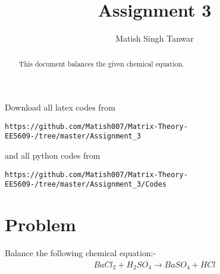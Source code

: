 \documentclass[journal,12pt,twocolumn]{IEEEtran}
\begin{document}
      \def\midbox#1{\raisebox{-0.5\baselineskip}[0in][0in]{#1}}
 \vspace{3cm}
 \title{Assignment 3}
 \author{Matish Singh Tanwar}
 \maketitle
 \newpage
 \bigskip
 \renewcommand{\thetable}{\theenumi}
\vspace{1.0cm}
\begin{abstract}
This document balances the given chemical equation.
\end{abstract}
\vspace{0.5cm}
Download all latex codes from 
\begin{lstlisting}
https://github.com/Matish007/Matrix-Theory-EE5609-/tree/master/Assignment_3
\end{lstlisting}
%
and all python codes from
\begin{lstlisting}
https://github.com/Matish007/Matrix-Theory-EE5609-/tree/master/Assignment_3/Codes
\end{lstlisting}
%
\vspace{0.5mm}
\section{Problem}
Balance the following chemical equation:-
\begin{align}\label{1}
    BaCl_2 + H_2SO_4 \xrightarrow{} BaSO_4 + HCl
\end{align}
\end{document}
